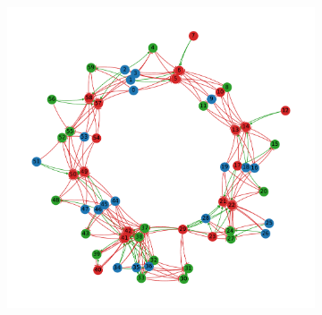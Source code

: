 \begin{figure}[H]
  \centering
  \hspace{-1cm}
  \begin{subfigure}[c]{0.73\textwidth}
    \includegraphics[width=\textwidth]{ploscb/img/combined_effective_graph_rep21_graphviz.pdf}
  \end{subfigure}
  \hspace*{-0.75cm}
  \begin{subfigure}[c]{0.29\textwidth}

\end{subfigure}
\end{figure}
